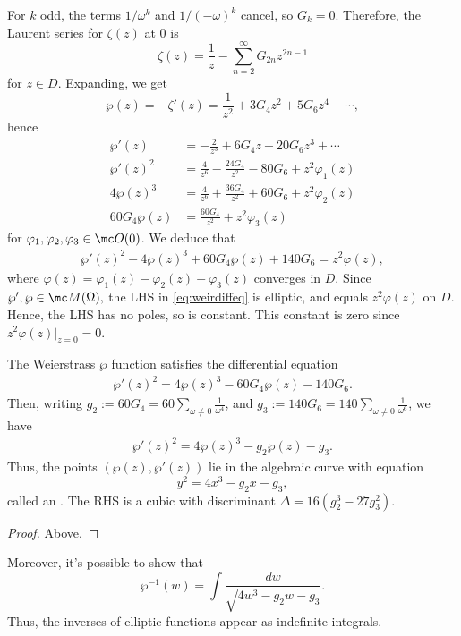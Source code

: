 \documentclass[11pt]{report}
\begin{document}
    For $k$ odd, the terms $1/\omega^k$ and $1/(-\omega)^k$ cancel, so $G_k=0$. Therefore, the Laurent series for $\zeta(z)$ at $0$ is
    $$\zeta(z) = \frac{1}{z}-\sum_{n=2}^\infty G_{2n}z^{2n-1}$$
    for $z \in D$. Expanding, we get
    $$\wp(z) = -\zeta'(z) = \frac{1}{z^2} + 3G_4z^2 + 5G_6z^4 + \cdots,$$
    hence
    \begin{align*}
        \wp'(z) &= -\frac{2}{z^3}+6G_4z + 20 G_6z^3 + \cdots 
        \\ \wp'(z)^2 &= \frac{4}{z^6}-\frac{24 G_4}{z^2}-80G_6 + z^2 \varphi_1(z)
        \\ 4\wp(z)^3 &= \frac{4}{z^6}+\frac{36 G_4}{z^2}+60G_6 + z^2 \varphi_2(z) \\ 60 G_4\wp(z) &= \frac{60G_4}{z^2} + z^2 \varphi_3(z)
    \end{align*}
    for $\varphi_1,\varphi_2,\varphi_3 \in \mc O(0)$. We deduce that
    \begin{align} \label{eq:weirdiffeq}
        \wp'(z)^2 - 4\wp(z)^3 + 60 G_4 \wp(z) + 140G_6 = z^2 \varphi(z),
    \end{align}
    where $\varphi(z) = \varphi_1(z) - \varphi_2(z) + \varphi_3(z)$ converges in $D$. Since $\wp',\wp \in \mc M (\Omega),$ the LHS in \eqref{eq:weirdiffeq} is elliptic, and equals $z^2 \varphi(z)$ on $D$. Hence, the LHS has no poles, so is constant. This constant is zero since $z^2 \varphi(z)|_{z=0}=0$.
    \begin{thm}
        The Weierstrass $\wp$ function satisfies the differential equation
        \begin{align*}
            \wp'(z)^2 = 4\wp(z)^3 -60G_4\wp(z) - 140G_6.
        \end{align*}
        Then, writing $g_2:=60G_4=60\sum_{\omega \neq 0}\frac{1}{\omega^4}$, and $g_3:= 140G_6=140\sum_{\omega \neq 0}\frac{1}{\omega^6}$, we have
        \begin{align*}
            \wp'(z)^2 = 4\wp(z)^3 - g_2\wp(z) - g_3.
        \end{align*}
        Thus, the points $(\wp(z),\wp'(z))$ lie in the algebraic curve with equation
        $$y^2 = 4x^3 - g_2x -g_3,$$
        called an . The RHS is a cubic with discriminant $\Delta = 16(g_2^3-27g_3^2)$.
    \end{thm}

\begin{proof}
    Above.
\end{proof}

Moreover, it's possible to show that
$$\wp^{-1}(w) = \int \frac{dw}{\sqrt{4w^3 - g_2w - g_3}}.$$
Thus, the inverses of elliptic functions appear as indefinite integrals.
\end{document}
